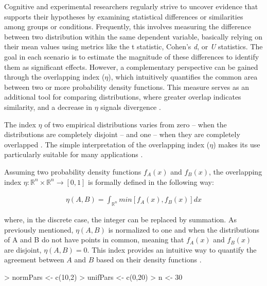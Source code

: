\documentclass[twocolumn]{article}
\begin{document}
Cognitive and experimental researchers regularly strive to uncover evidence that supports their hypotheses by examining statistical differences or similarities among groups or conditions. Frequently, this involves measuring the difference between two distribution within the same dependent variable, basically relying on their mean values using metrics like the t statistic, Cohen's \textit{d}, or \textit{U} statistics. The goal in each scenario is to estimate the magnitude of these differences to identify them as significant effects. However, a complementary perspective can be gained through the overlapping index ($\eta$), which intuitively quantifies the common area between two or more probability density functions. This measure serves as an additional tool for comparing distributions, where greater overlap indicates similarity, and a decrease in $\eta$ signals divergence \cite{pastore2019measuring}.

\vspace{0.2cm}

The index $\eta$ of two empirical distributions varies from zero -- when the distributions are completely disjoint -- and one -- when they are completely overlapped \cite{pastore2018overlapping}. The simple interpretation of the overlapping index ($\eta$) makes its use particularly suitable for many applications \cite{moravec1988sensor, viola1997alignment, inman1989overlapping, milanovic2002decomposing}.

Assuming two probability density functions $f_A (x)$ and $f_B (x)$, the overlapping index $\eta: \mathbb{R}^n \times \mathbb{R}^n \to [0,1] $ is formally defined in the following way:


\begin{eqnarray}
\eta (A,B) = \int_{\mathbb{R}^n} min [f_A (x),f_B (x)] dx
\end{eqnarray} 

where, in the discrete case, the integer can be replaced by summation. As previously mentioned, $\eta (A,B)$ is normalized to one and when the distributions of A and B do not have points in common, meaning that $f_A (x)$ and $f_B (x)$ are disjoint, $\eta (A,B) = 0$. This index provides an intuitive way to quantify the agreement between $A$ and $B$ based on their density functions \cite{inman1989overlapping}. 

\begin{Schunk}
\begin{Sinput}
> normPars <- c(10,2)
> unifPars <- c(0,20)
> n <- 30 
\end{Sinput}
\end{Schunk}
\end{document}

